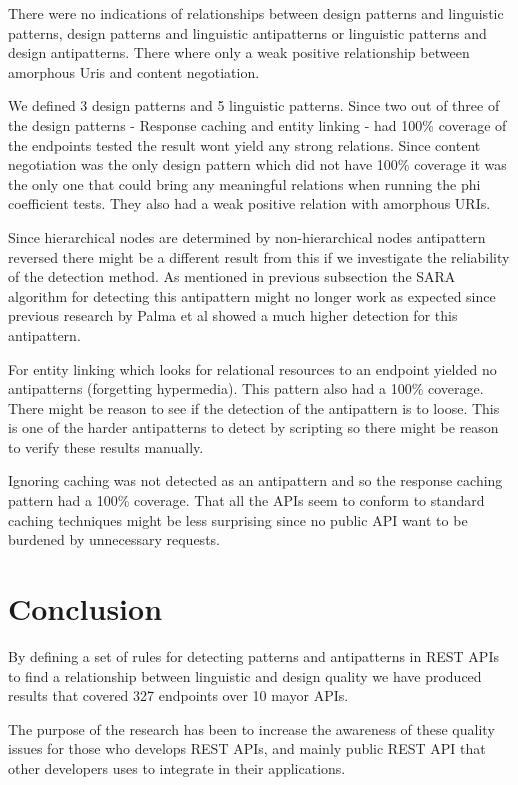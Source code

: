 \documentclass[a4paper,12pt]{article}
\begin{document}
There were no indications of relationships between design patterns and linguistic patterns, design patterns and linguistic antipatterns or linguistic patterns and design antipatterns. There where only a weak positive relationship between amorphous Uris and content negotiation. 

We defined 3 design patterns and 5 linguistic patterns. Since two out of three of the design patterns - Response caching and entity linking - had 100\% coverage of the endpoints tested the result wont yield any strong relations. Since content negotiation was the only design pattern which did not have 100\% coverage it was the only one that could bring any meaningful relations when running the phi coefficient tests. They also had a weak positive relation with amorphous URIs.

Since hierarchical nodes are determined by non-hierarchical nodes antipattern reversed there might be a different result from this if we investigate the reliability of the detection method. As mentioned in previous subsection the SARA algorithm for detecting this antipattern might no longer work as expected since previous research by Palma et al \cite{linguistic} showed a much higher detection for this antipattern.

For entity linking which looks for relational resources to an endpoint yielded no antipatterns (forgetting hypermedia). This pattern also had a 100\% coverage. There might be reason to see if the detection of the antipattern is to loose. This is one of the harder antipatterns to detect by scripting so there might be reason to verify these results manually. 

Ignoring caching was not detected as an antipattern and so the response caching pattern had a 100\% coverage. That all the APIs seem to conform to standard caching techniques might be less surprising since no public API want to be burdened by unnecessary requests.  
\newpage
		
\section{Conclusion}

By defining a set of rules for detecting patterns and antipatterns in REST APIs to find a relationship between linguistic and design quality we have produced results that covered 327 endpoints over 10 mayor APIs. 

The purpose of the research has been to increase the awareness of these quality issues for those who develops REST APIs, and mainly public REST API that other developers uses to integrate in their applications. 
\end{document}
